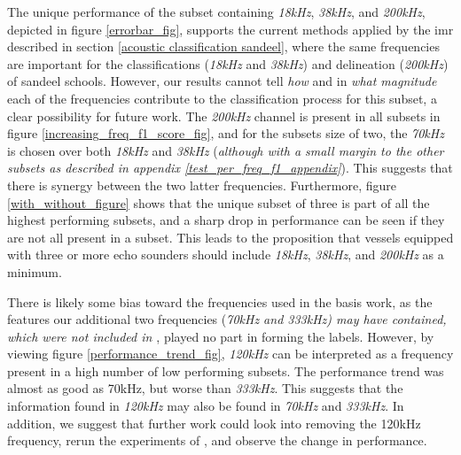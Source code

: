     The unique performance of the subset containing \textit{18kHz}, \textit{38kHz}, and \textit{200kHz}, depicted in figure \ref{errorbar_fig}, supports the current methods applied by the \gls{imr} described in section \ref{acoustic classification sandeel}, where the same frequencies are important for the classifications (\textit{18kHz} and \textit{38kHz}) and delineation (\textit{200kHz}) of sandeel schools. However, our results cannot tell \textit{how} and in \textit{what magnitude} each of the frequencies contribute to the classification process for this subset, a clear possibility for future work. The \textit{200kHz} channel is present in all subsets in figure \ref{increasing_freq_f1_score_fig}, and for the subsets size of two, the \textit{70kHz}  is chosen over both \textit{18kHz} and \textit{38kHz} (\textit{although with a small margin to the other subsets as described in appendix \ref{test_per_freq_f1_appendix}}). This suggests that there is synergy between the two latter frequencies. Furthermore, figure \ref{with_without_figure} shows that the unique subset of three is part of all the highest performing subsets, and a sharp drop in performance can be seen if they are not all present in a subset. This leads to the proposition that vessels equipped with three or more echo sounders should include \textit{18kHz}, \textit{38kHz}, and \textit{200kHz} as a minimum. 

    There is likely some bias toward the frequencies used in the basis work, as the features our additional two frequencies (\textit{70kHz and 333kHz) may have contained, which were not included in \citet{brautaset2020acoustic}}, played no part in forming the labels.  However, by viewing figure \ref{performance_trend_fig}, \textit{120kHz} can be interpreted as a frequency present in a high number of low performing subsets. The performance trend was almost as good as 70kHz, but worse than \textit{333kHz}. This suggests that the information found in \textit{120kHz} may also be found in \textit{70kHz} and \textit{333kHz}. In addition, we suggest that further work could look into removing the 120kHz frequency, rerun the experiments of \citet{brautaset2020acoustic}, and observe the change in performance. 
    
